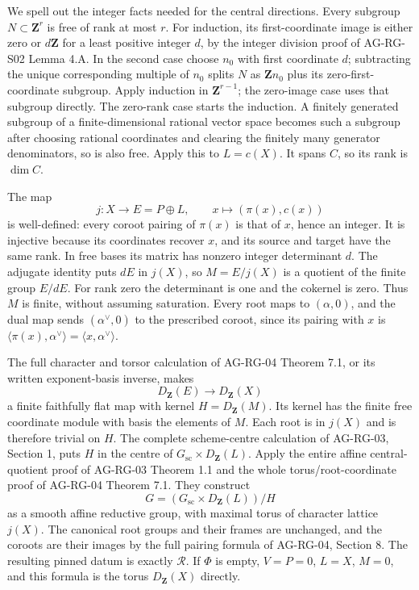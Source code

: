 \documentclass[11pt,a4paper,openany]{report}
\begin{document}
We spell out the integer facts needed for the central directions. Every subgroup \(N\subset\mathbf Z^r\) is free of rank at most \(r\). For induction, its first-coordinate image is either zero or \(d\mathbf Z\) for a least positive integer \(d\), by the integer division proof of AG-RG-S02 Lemma 4.A. In the second case choose \(n_0\) with first coordinate \(d\); subtracting the unique corresponding multiple of \(n_0\) splits \(N\) as \(\mathbf Z n_0\) plus its zero-first-coordinate subgroup. Apply induction in \(\mathbf Z^{r-1}\); the zero-image case uses that subgroup directly. The zero-rank case starts the induction. A finitely generated subgroup of a finite-dimensional rational vector space becomes such a subgroup after choosing rational coordinates and clearing the finitely many generator denominators, so is also free. Apply this to \(L=c(X)\). It spans \(C\), so its rank is \(\dim C\).

The map \[
 j:X\longrightarrow E=P\oplus L,\qquad
 x\longmapsto(\pi(x),c(x))
\] is well-defined: every coroot pairing of \(\pi(x)\) is that of \(x\), hence an integer. It is injective because its coordinates recover \(x\), and its source and target have the same rank. In free bases its matrix has nonzero integer determinant \(d\). The adjugate identity puts \(dE\) in \(j(X)\), so \(M=E/j(X)\) is a quotient of the finite group \(E/dE\). For rank zero the determinant is one and the cokernel is zero. Thus \(M\) is finite, without assuming saturation. Every root maps to \((\alpha,0)\), and the dual map sends \((\alpha^\vee,0)\) to the prescribed coroot, since its pairing with \(x\) is \(\langle\pi(x),\alpha^\vee\rangle=\langle x,\alpha^\vee\rangle\).

The full character and torsor calculation of AG-RG-04 Theorem 7.1, or its written exponent-basis inverse, makes \[
 D_{\mathbf Z}(E)\longrightarrow D_{\mathbf Z}(X)
\] a finite faithfully flat map with kernel \(H=D_{\mathbf Z}(M)\). Its kernel has the finite free coordinate module with basis the elements of \(M\). Each root is in \(j(X)\) and is therefore trivial on \(H\). The complete scheme-centre calculation of AG-RG-03, Section 1, puts \(H\) in the centre of \(G_{\mathrm{sc}}\times D_{\mathbf Z}(L)\). Apply the entire affine central-quotient proof of AG-RG-03 Theorem 1.1 and the whole torus/root-coordinate proof of AG-RG-04 Theorem 7.1. They construct \[
 G=(G_{\mathrm{sc}}\times D_{\mathbf Z}(L))/H
\] as a smooth affine reductive group, with maximal torus of character lattice \(j(X)\). The canonical root groups and their frames are unchanged, and the coroots are their images by the full pairing formula of AG-RG-04, Section 8. The resulting pinned datum is exactly \(\mathcal R\). If \(\Phi\) is empty, \(V=P=0\), \(L=X\), \(M=0\), and this formula is the torus \(D_{\mathbf Z}(X)\) directly.
\end{document}
